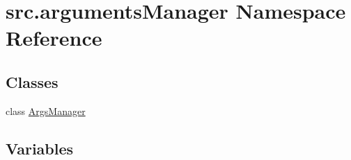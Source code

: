 \hypertarget{namespacesrc_1_1argumentsManager}{}\section{src.\+arguments\+Manager Namespace Reference}
\label{namespacesrc_1_1argumentsManager}
\subsection*{Classes}
\begin{DoxyCompactItemize}
\item 
class \hyperlink{classsrc_1_1argumentsManager_1_1ArgsManager}{Args\+Manager}
\end{DoxyCompactItemize}
\subsection*{Variables}
